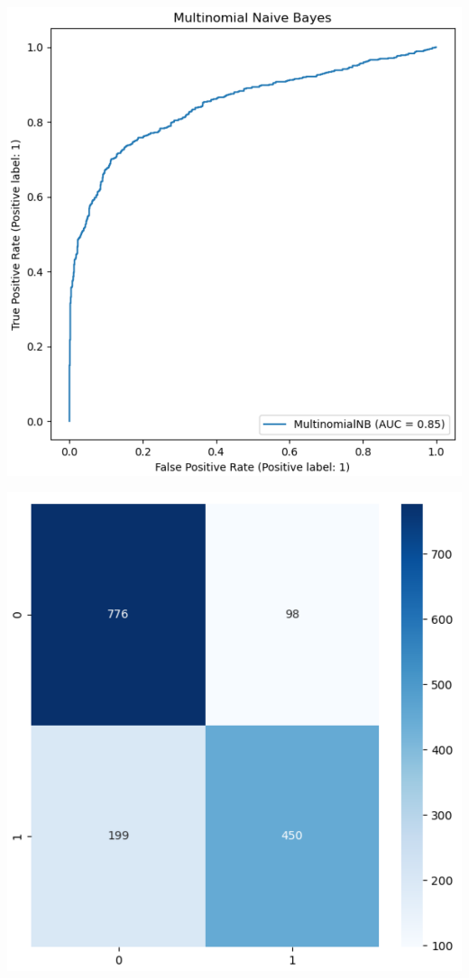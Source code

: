 \documentclass[11pt]{diazessay} %
\begin{document}
\begin{minipage}[t]{.45\linewidth}
\includegraphics[width=\linewidth]{images/mnb_plot.png}
\end{minipage}\hfill
\begin{minipage}[b]{.45\linewidth}
\includegraphics[width=\linewidth]{images/mnb_heatmap.png}
\end{minipage}\hfill
\end{document}
